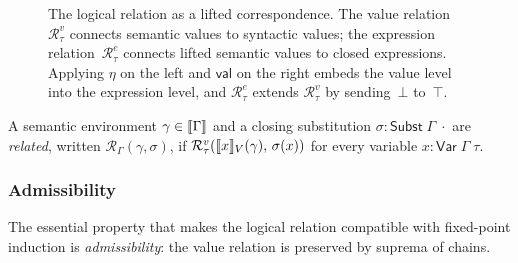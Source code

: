 \begin{figure}[h]
\centering
{}
\caption{The logical relation as a lifted correspondence.  The value
  relation~$\mathcal{R}^v_\tau$ connects semantic values to syntactic
  values; the expression relation~$\mathcal{R}^e_\tau$ connects lifted
  semantic values to closed expressions.  Applying $\eta$ on the left
  and $\mathsf{val}$ on the right embeds the value level into the
  expression level, and $\mathcal{R}^e_\tau$ extends
  $\mathcal{R}^v_\tau$ by sending~$\bot$ to~$\top$.}
\label{fig:logical-relation-lift}
\end{figure}

\begin{definition}
\label{def:rel-env}
A semantic environment $\gamma \in \llbracket \Gamma \rrbracket$ and a closing
substitution $\sigma : \mathsf{Subst}\;\Gamma\;\cdot$ are \emph{related},
written $\mathcal{R}_\Gamma(\gamma, \sigma)$, if $\mathcal{R}^v_\tau
(\llbracket x \rrbracket_V(\gamma),\, \sigma(x))$ for every variable $x :
\mathsf{Var}\;\Gamma\;\tau$.
\end{definition}

\subsubsection*{Admissibility}

The essential property that makes the logical relation compatible with
fixed-point induction is \emph{admissibility}: the value relation is
preserved by suprema of chains.

